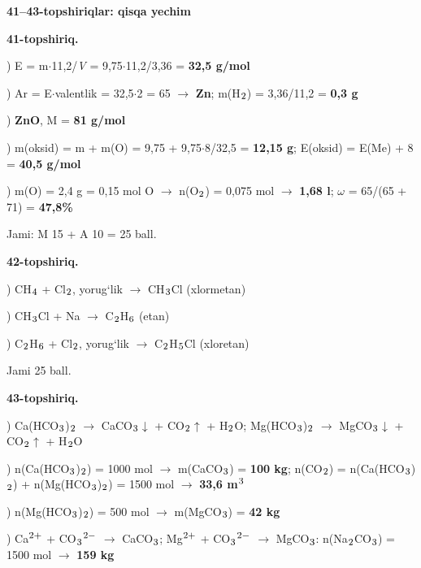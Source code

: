 \documentclass[11pt,a4paper]{article}
\renewcommand{\textsubscript}[1]{\ensuremath{_{\text{\fontsize{8}{8}\selectfont #1}}}}
\renewcommand{\textsuperscript}[1]{\ensuremath{^{\text{\fontsize{8}{8}\selectfont #1}}}}
\begin{document}
\noindent\textbf{41--43-topshiriqlar: qisqa yechim}\par\smallskip
\noindent\textbf{41-topshiriq.}\par
{}) E = m$\cdot$11,2/\textit{V} = 9,75$\cdot$11,2/3,36 = \textbf{32,5 g/mol}\par
{}) Ar = E$\cdot$valentlik = 32,5$\cdot$2 = 65 $\to$ \textbf{Zn}; m(H\textsubscript{2}) = 3,36/11,2 = \textbf{0,3 g}\par
{}) \textbf{ZnO}, M = \textbf{81 g/mol}\par
{}) m(oksid) = m + m(O) = 9,75 + 9,75$\cdot$8/32,5 = \textbf{12,15 g}; E(oksid) = E(Me) + 8 = \textbf{40,5 g/mol}\par
{}) m(O) = 2,4 g = 0,15 mol O $\to$ n(O\textsubscript{2}) = 0,075 mol $\to$ \textbf{1,68 l}; $\omega$ = 65/(65 + 71) = \textbf{47,8\%}\par
\noindent Jami: M 15 + A 10 = 25 ball.\par
\noindent\textbf{42-topshiriq.}\par
{}) CH\textsubscript{4} + Cl\textsubscript{2}, yorug`lik $\to$ CH\textsubscript{3}Cl (xlormetan)\par
{}) CH\textsubscript{3}Cl + Na $\to$ C\textsubscript{2}H\textsubscript{6} (etan)\par
{}) C\textsubscript{2}H\textsubscript{6} + Cl\textsubscript{2}, yorug`lik $\to$ C\textsubscript{2}H\textsubscript{5}Cl (xloretan)\par
\noindent Jami 25 ball.\par
\noindent\textbf{43-topshiriq.}\par
{}) Ca(HCO\textsubscript{3})\textsubscript{2} $\to$ CaCO\textsubscript{3}$\downarrow$ + CO\textsubscript{2}$\uparrow$ + H\textsubscript{2}O; Mg(HCO\textsubscript{3})\textsubscript{2} $\to$ MgCO\textsubscript{3}$\downarrow$ + CO\textsubscript{2}$\uparrow$ + H\textsubscript{2}O\par
{}) n(Ca(HCO\textsubscript{3})\textsubscript{2}) = 1000 mol $\to$ m(CaCO\textsubscript{3}) = \textbf{100 kg}; n(CO\textsubscript{2}) = n(Ca(HCO\textsubscript{3})\textsubscript{2}) + n(Mg(HCO\textsubscript{3})\textsubscript{2}) = 1500 mol $\to$ \textbf{33,6 m\textsuperscript{3}}\par
{}) n(Mg(HCO\textsubscript{3})\textsubscript{2}) = 500 mol $\to$ m(MgCO\textsubscript{3}) = \textbf{42 kg}\par
{}) Ca\textsuperscript{2+} + CO\textsubscript{3}\textsuperscript{2$-$} $\to$ CaCO\textsubscript{3}; Mg\textsuperscript{2+} + CO\textsubscript{3}\textsuperscript{2$-$} $\to$ MgCO\textsubscript{3}: n(Na\textsubscript{2}CO\textsubscript{3}) = 1500 mol $\to$ \textbf{159 kg}\par
\end{document}
